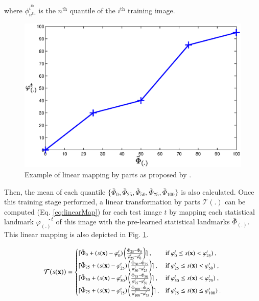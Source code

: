 \begin{enumerate}[leftmargin=*]
\noindent where $\phi_{n^\text{th}}^{i^{\text{th}}}$ is the $n^{\text{th}}$ quantile of the $i^{\text{th}}$ training image.

\begin{figure}
	\centering
	\includegraphics[width=0.7\linewidth]{03_image_processing/03_preprocessing/figures/normalization/linear_transform_parts.eps}
	\caption{Example of linear mapping by parts as proposed by \cite{Nyul2000}.}
	\label{fig:imnorm}
\end{figure}

Then, the mean of each quantile $\{ \bar{\Phi}_{0}, \bar{\Phi}_{25}, \bar{\Phi}_{50}, \bar{\Phi}_{75}, \bar{\Phi}_{100} \}$ is also calculated.
Once this training stage performed, a linear transformation by parts $\mathcal{T}(.)$ can be computed (Eq. \ref{eq:linearMap}) for each test image $t$ by mapping each statistical landmark $\varphi_{(.)}̂^{t}$ of this image with the pre-learned statistical landmarks $\bar{\Phi}_{(.)}$. This linear mapping is also depicted in Fig. \ref{fig:imnorm}.

\begin{equation}
\small
\mathcal{T}(s(\mathbf{x})) =
  \begin{cases}
    \lceil \bar{\Phi}_{0}+( s(\mathbf{x}) - \varphi_{0}^{t} ) \left( \frac{\bar{\Phi}_{25} - \bar{\Phi}_{0}}{\varphi_{25}^{t} - \varphi_{0}^{t}} \right) \rceil \ , & \text{if $\varphi_{0}^{t} \leq s(\mathbf{x})<\varphi_{25}^{t})$} \ , \\
    \lceil \bar{\Phi}_{25}+( s(\mathbf{x}) - \varphi_{25}^{t} ) \left( \frac{\bar{\Phi}_{50} - \bar{\Phi}_{25}}{\varphi_{50}^{t} - \varphi_{25}^{t}} \right) \rceil \ , & \text{if $\varphi_{25}^{t} \leq s(\mathbf{x})<\varphi_{50}^{t})$} \ , \\
    \lceil \bar{\Phi}_{50}+( s(\mathbf{x}) - \varphi_{50}^{t} ) \left( \frac{\bar{\Phi}_{75} - \bar{\Phi}_{50}}{\varphi_{75}^{t} - \varphi_{50}^{t}} \right) \rceil \ , & \text{if $\varphi_{50}^{t} \leq s(\mathbf{x})<\varphi_{75}^{t})$} \ , \\
    \lceil \bar{\Phi}_{75}+( s(\mathbf{x}) - \varphi_{75}^{t} ) \left( \frac{\bar{\Phi}_{100} - \bar{\Phi}_{75}}{\varphi_{100}^{t} - \varphi_{75}^{t}} \right) \rceil \ , & \text{if $\varphi_{75}^{t} \leq s(\mathbf{x})\leq \varphi_{100}^{t})$} \ .
  \end{cases}
  \label{eq:linearMap}
\end{equation}


\end{enumerate}
